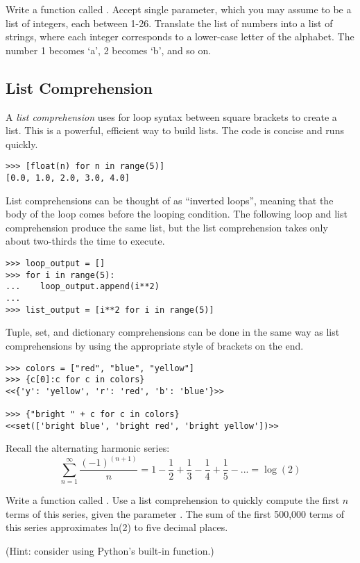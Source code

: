 \begin{problem} %
Write a function called .
Accept single parameter, which you may assume to be a list of integers, each between 1-26.
Translate the list of numbers into a list of strings, where each integer corresponds to a lower-case letter of the alphabet.
The number 1 becomes `a', 2 becomes `b', and so on.
\end{problem}

\subsection*{List Comprehension} %

A \emph{list comprehension} uses for loop syntax between square brackets to create a list.
This is a powerful, efficient way to build lists.
The code is concise and runs quickly.

\begin{lstlisting}
>>> [float(n) for n in range(5)]
[0.0, 1.0, 2.0, 3.0, 4.0]
\end{lstlisting}

List comprehensions can be thought of as ``inverted loops'', meaning that the body of the loop comes before the looping condition.
The following loop and list comprehension produce the same list, but the list comprehension takes only about two-thirds the time to execute.

\begin{lstlisting}
>>> loop_output = []
>>> for i in range(5):
...    loop_output.append(i**2)
...
>>> list_output = [i**2 for i in range(5)]
\end{lstlisting}

Tuple, set, and dictionary comprehensions can be done in the same way as list comprehensions by using the appropriate style of brackets on the end.

\begin{lstlisting}
>>> colors = ["red", "blue", "yellow"]
>>> {c[0]:c for c in colors}
<<{'y': 'yellow', 'r': 'red', 'b': 'blue'}>>

>>> {"bright " + c for c in colors}
<<set(['bright blue', 'bright red', 'bright yellow'])>>
\end{lstlisting}

\begin{problem} %
Recall the alternating harmonic series:
\[\sum_{n=1}^\infty \frac{(-1)^{(n+1)}}{n} = 1 - \frac{1}{2} + \frac{1}{3} - \frac{1}{4} + \frac{1}{5} - ... = \log(2)\]

Write a function called .
Use a list comprehension to quickly compute the first $n$ terms of this series, given the parameter .
The sum of the first 500,000 terms of this series approximates ln(2) to five decimal places.

(Hint: consider using Python's built-in  function.)
\end{problem}

